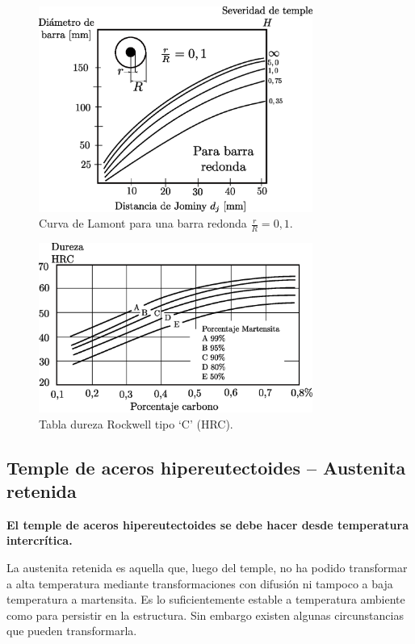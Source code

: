  

\begin{figure}[htb!]
    \centering
    \includegraphics[width=0.8\textwidth]{fig/lamont.eps}
    \caption{Curva de Lamont para una barra redonda $\frac{r}{R}=0,1$.}
    \label{fig:lamont}
\end{figure}


\begin{figure}[htb!]
    \centering
    \includegraphics[width=0.8\textwidth]{fig/HRCdiag.eps}
    \caption{Tabla dureza Rockwell tipo `C' (HRC).}
    \label{fig:rockewell}
\end{figure}

\subsection{Temple de aceros hipereutectoides -- Austenita retenida}
\textbf{El temple de aceros hipereutectoides se debe hacer desde temperatura intercrítica.}

La austenita retenida es aquella que, luego del temple, no ha podido transformar a alta temperatura mediante transformaciones con difusión ni tampoco a baja temperatura a martensita. Es lo suficientemente estable a temperatura ambiente como para persistir en la estructura. Sin embargo existen algunas circunstancias que pueden transformarla.


